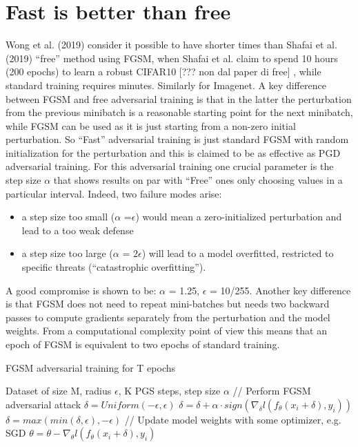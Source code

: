 \documentclass{article}
\begin{document}
\section{Fast is better than free}

Wong et al. (2019) consider it possible to have shorter times than Shafai et al. (2019) “free” method using FGSM,  when Shafai et al. claim to spend 10 hours (200 epochs) to learn a robust CIFAR10 [??? non dal paper di free] , while standard training requires minutes. Similarly for Imagenet.  
A key difference between FGSM and free adversarial training is that in the latter the perturbation from the previous minibatch is a reasonable starting point for the next minibatch, while FGSM can be used as it is just starting from a non-zero initial perturbation.
So “Fast” adversarial training is just standard FGSM with random initialization for the perturbation and this is claimed to be as effective as PGD adversarial training.
For this adversarial training one crucial parameter is the step size $\alpha$ that shows results on par with “Free” ones only choosing values in a particular interval. Indeed, two failure modes arise: 
\begin{itemize}

\item a step size too small ($\alpha$ =$\epsilon$) would mean a zero-initialized perturbation and lead to a too weak defense
\item a step size too large ($\alpha$ = $2\epsilon$) will lead to a model overfitted, restricted to specific threats (“catastrophic overfitting”).
\end{itemize}

A good compromise is shown to be: $\alpha$ = 1.25, $\epsilon$ = 10/255.
Another key difference is that FGSM does not need to repeat mini-batches but needs two backward passes to compute gradients separately from the perturbation and the model weights. From a computational complexity point of view this means that an epoch of FGSM is equivalent to two epochs of standard training.

\begin{algorithm}[H]
	\caption{FGSM adversarial training for T epochs}
	\begin{algorithmic}[1]
		\Require Dataset of size M, radius $\epsilon$, K PGS steps, step size $\alpha$
		\State // Perform FGSM adversarial attack
		\State $\delta = Uniform(-\epsilon, \epsilon)$
		\State $\delta = \delta + \alpha \cdot sign(\nabla_{\delta} l(f_{\theta}(x_i + \delta), y_i))$
		\State $\delta = max(min(\delta, \epsilon), -\epsilon)$
		\State // Update model weights with some optimizer, e.g. SGD
		\State $\theta = \theta - \nabla_{\theta} l(f_{\theta}(x_i + \delta), y_i)$
		\EndFor
		\EndFor
	\end{algorithmic}
\end{algorithm}
\end{document}
